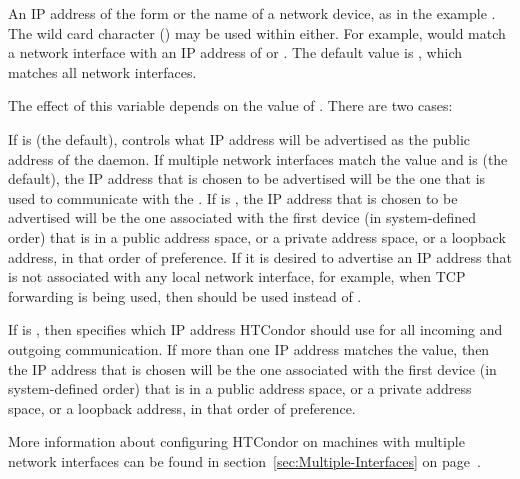 \begin{description}
\label{param:NetworkInterface}
\item[\Macro{NETWORK\_INTERFACE}]
  An IP address of the form  or the name
  of a network device, as in the example .
  The wild card character (\Expr{*}) may be used within either.
  For example,  would match a network interface
  with an IP address of  or .
  The default value is \Expr{*}, which matches all network interfaces.

  The effect of this variable depends on the value of
  .  There are two cases:

  If  is  (the default),
   controls what IP address
  will be advertised as the public address of the daemon.  
  If multiple network interfaces match the value and
   is  (the default),
  the IP address that is chosen to be advertised will be the one that
  is used to communicate with the .
  If  is , the IP address
  that is chosen to be advertised will be the one associated with the
  first device (in system-defined order) that is in a public address
  space, or a private address space, or a loopback address, in that
  order of preference.  
  If it is desired to advertise an IP address
  that is not associated with any local network interface, 
  for example, when TCP forwarding is being used,
  then  should be used instead of
  .

  If  is ,
  then  specifies which IP address HTCondor
  should use for all incoming and outgoing communication.
  If more than one IP address matches the value, 
  then the IP address that is
  chosen will be the one associated with the first device (in
  system-defined order) that is in a public address space, or a
  private address space, or a loopback address, in that order of
  preference.

  More information about configuring HTCondor on machines with multiple
  network interfaces can be found in
  section~\ref{sec:Multiple-Interfaces} on
  page~\pageref{sec:Multiple-Interfaces}.


\end{description}
